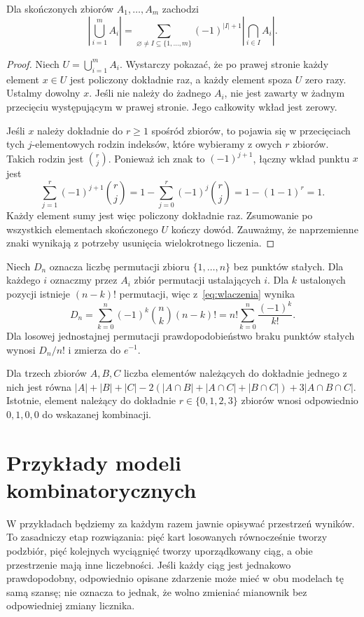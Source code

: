 \begin{twierdzenie}
Dla skończonych zbiorów $A_1,\ldots,A_m$ zachodzi
\begin{equation}\label{eq:wlaczenia}
\left|\bigcup_{i=1}^m A_i\right|
=\sum_{\varnothing\ne I\subseteq\{1,\ldots,m\}}
 (-1)^{|I|+1}\left|\bigcap_{i\in I}A_i\right|.
\end{equation}
\end{twierdzenie}
\begin{proof}
Niech $U=\bigcup_{i=1}^m A_i$. Wystarczy pokazać, że
po prawej stronie każdy element $x\in U$ jest policzony
dokładnie raz, a każdy element spoza $U$ zero razy.
Ustalmy dowolny $x$. Jeśli nie należy do żadnego $A_i$,
nie jest zawarty w żadnym przecięciu występującym
w prawej stronie. Jego całkowity wkład jest zerowy.

Jeśli $x$ należy dokładnie do $r\geq1$ spośród zbiorów,
to pojawia się w przecięciach tych $j$-elementowych
rodzin indeksów, które wybieramy z owych $r$ zbiorów.
Takich rodzin jest $\binom rj$. Ponieważ ich znak to
$(-1)^{j+1}$, łączny wkład punktu $x$ jest
\[
\sum_{j=1}^r(-1)^{j+1}\binom rj
=1-\sum_{j=0}^r(-1)^j\binom rj
=1-(1-1)^r=1.
\]
Każdy element sumy jest więc policzony dokładnie raz.
Zsumowanie po wszystkich elementach skończonego $U$
kończy dowód. Zauważmy, że naprzemienne znaki wynikają
z potrzeby usunięcia wielokrotnego liczenia.
\end{proof}

\begin{przyklad}
Niech $D_n$ oznacza liczbę permutacji zbioru $\{1,\ldots,n\}$ bez punktów
stałych. Dla każdego $i$ oznaczmy przez $A_i$ zbiór permutacji
ustalających $i$. Dla $k$ ustalonych pozycji istnieje $(n-k)!$ permutacji,
więc z~\eqref{eq:wlaczenia} wynika
\[
D_n=\sum_{k=0}^{n}(-1)^k\binom nk(n-k)!
=n!\sum_{k=0}^{n}\frac{(-1)^k}{k!}.
\]
Dla losowej jednostajnej permutacji prawdopodobieństwo braku punktów
stałych wynosi $D_n/n!$ i zmierza do $e^{-1}$.
\end{przyklad}

\begin{przyklad}
Dla trzech zbiorów $A,B,C$ liczba elementów należących do dokładnie
jednego z nich jest równa
$|A|+|B|+|C|-2(|A\cap B|+|A\cap C|+|B\cap C|)+3|A\cap B\cap C|$.
Istotnie, element należący do dokładnie $r\in\{0,1,2,3\}$ zbiorów
wnosi odpowiednio $0,1,0,0$ do wskazanej kombinacji.
\end{przyklad}

\section{Przykłady modeli kombinatorycznych}
W przykładach będziemy za każdym razem jawnie opisywać
przestrzeń wyników. To zasadniczy etap rozwiązania: pięć kart
losowanych równocześnie tworzy podzbiór, pięć kolejnych wyciągnięć
tworzy uporządkowany ciąg, a obie przestrzenie mają inne liczebności.
Jeśli każdy ciąg jest jednakowo prawdopodobny, odpowiednio opisane
zdarzenie może mieć w obu modelach tę samą szansę; nie oznacza to
jednak, że wolno zmieniać mianownik bez odpowiedniej zmiany licznika.

